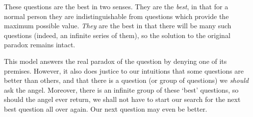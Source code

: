 These questions are the best in two senses.
They are the \emph{best}, in that for a normal person they are indistinguishable from questions which provide the maximum possible value.
\emph{They} are the best in that there will be many such questions (indeed, an infinite series of them), so the solution to the original paradox remains intact.

This model answers the real paradox of the question by denying one of its premises.
However, it also does justice to our intuitions that some questions are better than others, and that there is a question (or group of questions) we \emph{should} ask the angel.
Moreover, there is an infinite group of these `best' questions, so should the angel ever return, we shall not have to start our search for the next best question all over again.
Our next question may even be better.


